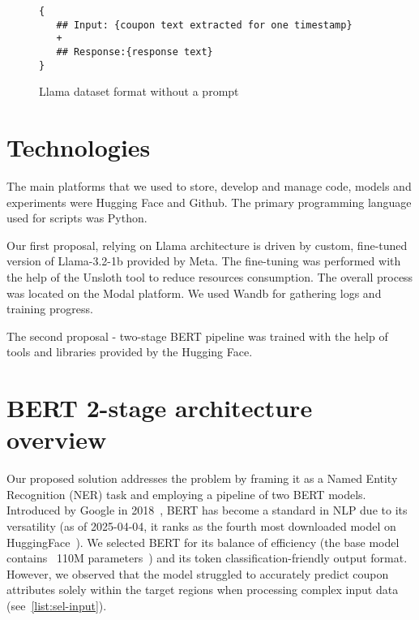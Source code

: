 \documentclass[licencjacka,en]{pracamgr}
\begin{document}
\begin{figure}[h]
\centering
\begin{tcolorbox}[sharp corners, boxrule=0.5mm, colframe=black, colback=white, coltitle=black, width=0.9\textwidth]
\begin{BVerbatim}
{
   ## Input: {coupon text extracted for one timestamp}
   +
   ## Response:{response text}
}
\end{BVerbatim}
\end{tcolorbox}
\caption{Llama dataset format without a prompt}
\label{fig:llama_ds_wth}
\end{figure}

\chapter{Technologies}
The main platforms that we used to store, develop and manage code, models and experiments were Hugging Face\cite{hugging-face} and Github\cite{github}. The primary programming language used for scripts was Python\cite{python}.

Our first proposal, relying on Llama architecture is driven by custom, fine-tuned version of Llama-3.2-1b provided by Meta\cite{meta-llama}. The fine-tuning was performed with the help of the Unsloth\cite{unsloth} tool to reduce resources consumption. The overall process was located on the Modal\cite{modal} platform. We used Wandb\cite{wandb} for gathering logs and training progress.

The second proposal - two-stage BERT pipeline was trained with the help of tools and libraries provided by the Hugging Face.


\chapter{BERT 2-stage architecture overview}
Our proposed solution addresses the problem by framing it as a Named Entity Recognition (NER) task and employing a pipeline of two BERT models. Introduced by Google in 2018~\cite{BERT_intro}, BERT has become a standard in NLP due to its versatility (as of 2025-04-04, it ranks as the fourth most downloaded model on HuggingFace~\cite{BERT_hf}). We selected BERT for its balance of efficiency (the base model contains ~110M parameters~\cite{BERT_hf}) and its token classification-friendly output format. However, we observed that the model struggled to accurately predict coupon attributes solely within the target regions when processing complex input data (see~\ref{list:sel-input}).
\end{document}
